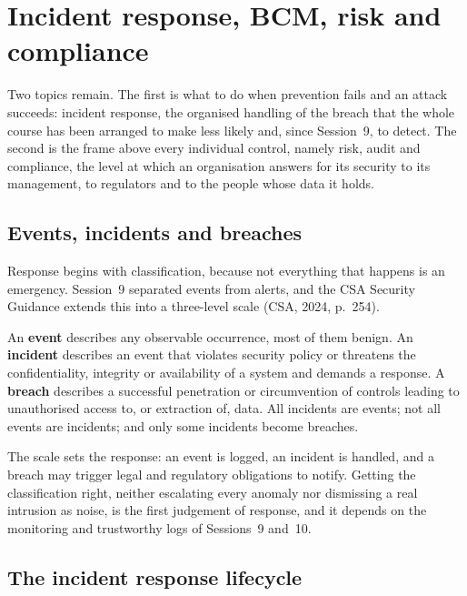 \chapter{Incident response, BCM, risk and compliance}

Two topics remain. The first is what to do when prevention fails and an
attack succeeds: incident response, the organised handling of the breach
that the whole course has been arranged to make less likely and, since
Session~9, to detect. The second is the frame above every individual
control, namely risk, audit and compliance, the level at which an
organisation answers for its security to its management, to regulators and
to the people whose data it holds.

\section{Events, incidents and breaches}

Response begins with classification, because not everything that happens is
an emergency. Session~9 separated events from alerts, and the CSA Security
Guidance extends this into a three-level scale (CSA, 2024, p.~254).

\begin{definition}\label{def:incident}
An \textbf{event} describes any observable occurrence, most of them benign.
An \textbf{incident} describes an event that violates security policy or
threatens the confidentiality, integrity or availability of a system and
demands a response. A \textbf{breach} describes a successful penetration or
circumvention of controls leading to unauthorised access to, or extraction
of, data. All incidents are events; not all events are incidents; and only
some incidents become breaches.
\end{definition}

The scale sets the response: an event is logged, an incident is handled, and
a breach may trigger legal and regulatory obligations to notify. Getting the
classification right, neither escalating every anomaly nor dismissing a real
intrusion as noise, is the first judgement of response, and it depends on
the monitoring and trustworthy logs of Sessions~9 and~10.

\section{The incident response lifecycle}


